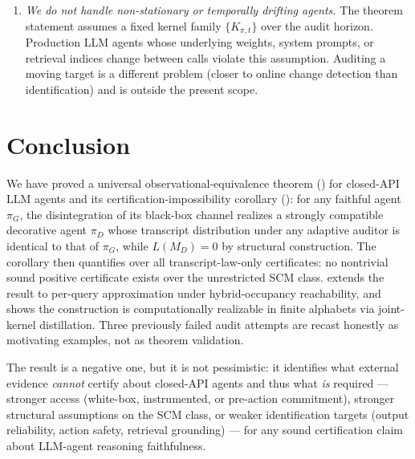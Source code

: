 \documentclass{article}
\theoremstyle{plain}
\theoremstyle{definition}
\theoremstyle{remark}
\begin{document}
\begin{enumerate}
  \item \emph{We do not handle non-stationary or temporally drifting agents.}
  The theorem statement assumes a fixed kernel family $\{K_{\pi, t}\}$ over
  the audit horizon. Production LLM agents whose underlying weights, system
  prompts, or retrieval indices change between calls violate this assumption.
  Auditing a moving target is a different problem (closer to online change
  detection than identification) and is outside the present scope.
\end{enumerate}

\section{Conclusion}\label{sec:conclusion}

We have proved a universal observational-equivalence theorem
() for closed-API LLM agents and its
certification-impossibility corollary (): for any faithful
agent $\pi_G$, the disintegration of its black-box channel realizes a
strongly compatible decorative agent $\pi_D$ whose transcript distribution
under any adaptive auditor is identical to that of $\pi_G$, while
$L(M_D) = 0$ by structural construction. The corollary then quantifies over
all transcript-law-only certificates: no nontrivial sound positive certificate
exists over the unrestricted SCM class.  extends the result
to per-query approximation under hybrid-occupancy reachability, and
 shows the construction is computationally
realizable in finite alphabets via joint-kernel distillation. Three previously
failed audit attempts are recast honestly as motivating examples, not as
theorem validation.

The result is a negative one, but it is not pessimistic: it identifies what
external evidence \emph{cannot} certify about closed-API agents and thus what
\emph{is} required --- stronger access (white-box, instrumented, or pre-action
commitment), stronger structural assumptions on the SCM class, or weaker
identification targets (output reliability, action safety, retrieval grounding)
--- for any sound certification claim about LLM-agent reasoning faithfulness.




\appendix
\end{document}

